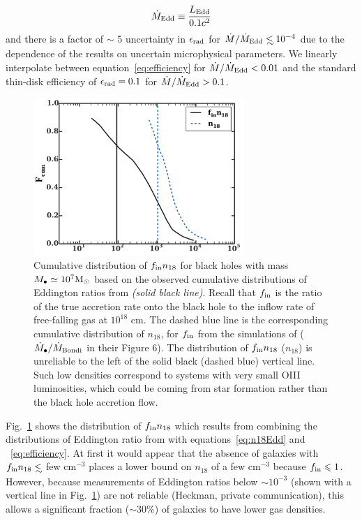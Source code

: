 \documentclass[usenatbib,fleqn]{mnras}
\newcommand\lsim{\mathrel{\rlap{\lower4pt\hbox{\hskip1pt$\sim$}}
    \raise1pt\hbox{$<$}}}
\newcommand{\Mbh}[1][]{M_{\bullet#1}}
\newcommand{\Msun}{{\rm M_\odot}}
\begin{document}
\begin{equation} 
 \dot{M}_{\rm Edd} \equiv \frac{L_{\rm Edd}}{0.1 c^2} 
\end{equation}
%
and
there is a factor of $\sim$ 5 uncertainty in $\epsilon_{\rm rad}$ for
$\dot{M}/\dot{M}_{\rm Edd}\lsim 10^{-4}$ due to the dependence of the
results on uncertain microphysical parameters.  We linearly
interpolate between equation~\eqref{eq:efficiency} for
$\dot{M}/\dot{M}_{\rm Edd}<0.01$ and the standard thin-disk efficiency
of $\epsilon_{\rm rad}=0.1$ for $\dot{M}/\dot{M}_{\rm Edd}>0.1$.

\begin{figure}
\includegraphics[width=8cm]{fcum_n18.pdf}
\caption{\label{fig:n18Cum} Cumulative distribution of $f_{\rm in}
  n_{18}$ for black holes with mass $\Mbh\simeq 10^{7} \Msun$ based on
  the observed cumulative distributions of Eddington ratios from
  \citet{Kauffmann&Heckman2009} {\it (solid black line)}. Recall that
  $f_{\rm in}$ is the ratio of the true accretion rate onto the black
  hole to the inflow rate of free-falling gas at $10^{18}$ cm.  The
  dashed blue line is the corresponding cumulative distribution of
  $n_{18}$, for $f_{\rm in}$ from the simulations of \citet{Li+2013}
  ($\dot{M}_{\bullet}/\dot{M}_{\rm Bondi}$ in their Figure 6). The
  distribution of $f_{\rm in} n_{18}$ ($n_{18}$) is unreliable to the
  left of the solid black (dashed blue) vertical line. Such low
  densities correspond to systems with very small OIII luminosities,
  which could be coming from star formation rather than the black hole
  accretion flow.}
\end{figure}


Fig.~\ref{fig:n18Cum} shows the distribution of $f_{\rm in} n_{18}$
which results from combining the distributions of Eddington ratio from
\citet{Kauffmann&Heckman2009} with equations~\eqref{eq:n18Edd} and
~\eqref{eq:efficiency}.  At first it would appear that the absence of
galaxies with $f_{\rm in }n_{18} \lsim$ few cm$^{-3}$ places a lower
bound on $n_{18}$ of a few cm$^{-3}$ because $f_{\rm in} \le 1$.
However, because measurements of Eddington ratios below $\sim 10^{-3}$
(shown with a vertical line in Fig.~\ref{fig:n18Cum}) are not reliable
(Heckman, private communication), this allows a significant fraction
($\sim 30\%$) of galaxies to have lower gas densities.
\end{document}
